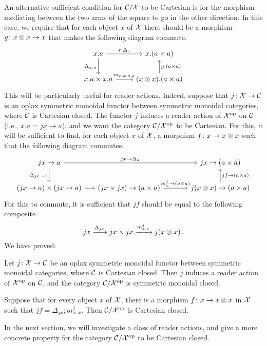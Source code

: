 \documentclass{article}
\begin{document}
An alternative sufficient condition for ${\mathcal{C}}/\mathcal X$ to be Cartesian is for the morphism mediating between the two arms of the square to go in the other direction.  
In this case, we require that for each object $x$ of $\mathcal X$ there should be a morphism $g \colon x\otimes x \to x$ that makes the following diagram commute.
\[
  \begin{tikzcd}
    x.a \arrow[r, "x.\Delta_a"] \arrow[d, "\Delta_{x.a}"']
      & x.(a\times a) \\
    x.a \times x.a \arrow[r, "{m_{x,x,a,a}}"]
      & (x \tensor x).(a \times a) \arrow[u, "g.(a\times a)"']
  \end{tikzcd}
  \]
This will be particularly useful for reader actions.  
Indeed, suppose that $j\colon \mathcal X \to {\mathcal{C}}$ is an oplax symmetric monoidal functor between symmetric monoidal categories, where ${\mathcal{C}}$ is Cartesian closed.  
The functor $j$ induces a reader action of $\mathcal X^{\mathrm{op}}$ on ${\mathcal{C}}$ (i.e., $x.a = jx \to a$), and we want the category ${\mathcal{C}}/\mathcal X^{\mathrm{op}}$ to be Cartesian.  
For this, it will be sufficient to find, for each object $x$ of $\mathcal X$, a morphism $f \colon x \to x\otimes x$ such that the following diagram commutes.
\[
  \begin{tikzcd}
    jx \to a \arrow[rr, "jx \to \Delta_a"] \arrow[d, "\Delta_{jx \to a}"']
      &[-10pt]
        &[+10pt] jx \to (a \times a) \\
    (jx \to a) \times (jx \to a) \arrow[r]
      & (jx \times jx) \to (a \times a) \arrow[r, "m^j_x \to (a\times a)"]
        & j(x\tensor x) \to (a \times a) \arrow[u, "jf \to (a \times a)"']
  \end{tikzcd}
  \]
For this to commute, it is sufficient that $jf$ should be equal to the following composite.
\[
  jx \xrightarrow{\Delta_{jx}}
  jx \times jx \xrightarrow{m^j_{x,x}}
  j(x \otimes x)\,.
  \]
We have proved:

\begin{theorem}
  Let $j\colon \mathcal X \to {\mathcal{C}}$ be an oplax symmetric monoidal functor between symmetric monoidal categories, where ${\mathcal{C}}$ is Cartesian closed.  
  Then $j$ induces a reader action of $\mathcal X^{\mathrm{op}}$ on ${\mathcal{C}}$, and the category ${\mathcal{C}}/\mathcal X^{\mathrm{op}}$ is symmetric monoidal closed.

  Suppose that for every object $x$ of $\mathcal X$, there is a morphism $f \colon x \to x\otimes x$ in $\mathcal X$ such that $jf=\Delta_{jx};m^j_{x,x}$.  
  Then ${\mathcal{C}}/\mathcal X^{\mathrm{op}}$ is Cartesian closed.
  \label{TheCartesianClosedCx}
\end{theorem}

In the next section, we will investigate a class of reader actions, and give a more concrete property for the category ${\mathcal{C}}/\mathcal X^{\mathrm{op}}$ to be Cartesian closed.
\end{document}
